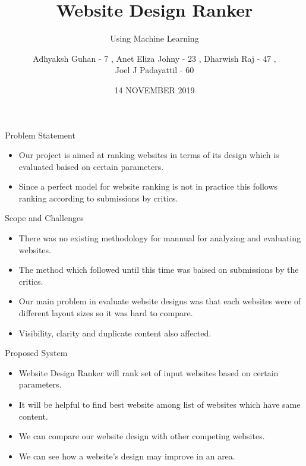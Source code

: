 \documentclass[11pt]{beamer}
\begin{document}
	\title{\textbf{Website Design Ranker}}
	\subtitle{Using Machine Learning}
	\date{14 NOVEMBER 2019}
	\author{{\scriptsize Adhyaksh Guhan - 7 , Anet Eliza Johny - 23 , Dharwish Raj - 47 , \\ Joel J Padayattil - 60}}
	\begin{frame}[plain]
		\maketitle
	\end{frame}
	\begin{frame}{Problem Statement}
		\begin{itemize}
			
			
			\item Our project is aimed at ranking websites in terms of its design which is evaluated baised on certain parameters.
			
			\item Since a perfect model for website ranking  is not in practice this  follows ranking according to submissions by critics.
			
		\end{itemize}
	\end{frame}
	\begin{frame}{Scope and Challenges}
		\begin{itemize}
			
			\item There was no existing methodology for mannual for analyzing and evaluating websites.
			
			\item The method which followed until this time was baised on submissions by the critics.
			
			\item Our main problem in evaluate website designs was that each websites were of different layout sizes so it was hard to compare.
			
			\item Visibility, clarity and duplicate content also affected.
			
	
			
		\end{itemize}
	\end{frame}
	\begin{frame}{Proposed System}
			\begin{itemize}
			\item Website Design Ranker will rank set of input websites based on certain parameters.
			\item It will be helpful to find best website among list of websites which have same content.
			\item We can compare our website design with other competing websites.
			\item We can see how a website's design may improve in an area.

			\end{itemize}
	\end{frame}
\end{document}
